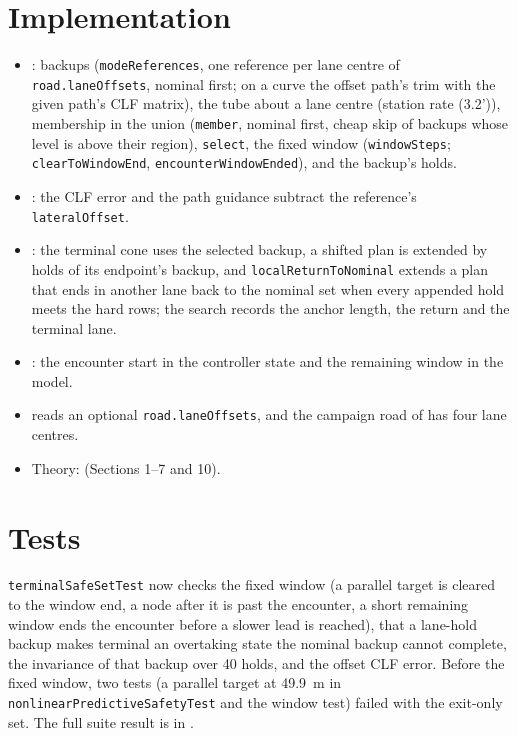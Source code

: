 \documentclass[11pt]{article}
\begin{document}
\section{Implementation}
\begin{itemize}
\item {}: backups (\texttt{modeReferences},
  one reference per lane centre of \texttt{road.laneOffsets}, nominal first;
  on a curve the offset path's trim with the given path's CLF matrix), the
  tube about a lane centre (station rate (3.2')), membership in the union
  (\texttt{member}, nominal first, cheap skip of backups whose level is above
  their region), \texttt{select}, the fixed window (\texttt{windowSteps};
  \texttt{clearToWindowEnd}, \texttt{encounterWindowEnded}), and the backup's
  holds.
\item {}: the CLF error and the path
  guidance subtract the reference's \texttt{lateralOffset}.
\item {}: the terminal cone uses the
  selected backup, a shifted plan is extended by holds of its endpoint's
  backup, and \texttt{localReturnToNominal} extends a plan that ends in
  another lane back to the nominal set when every appended hold meets the
  hard rows; the search records the anchor length, the return and the
  terminal lane.
\item {}: the encounter start
  in the controller state and the remaining window in the model.
\item {} reads an optional
  \texttt{road.laneOffsets}, and the campaign road of
   has four lane centres.
\item Theory:  (Sections 1--7 and 10).
\end{itemize}

\section{Tests}
\texttt{terminalSafeSetTest} now checks the fixed window (a parallel target is
cleared to the window end, a node after it is past the encounter, a short
remaining window ends the encounter before a slower lead is reached), that a
lane-hold backup makes terminal an overtaking state the nominal backup cannot
complete, the invariance of that backup over 40 holds, and the offset CLF
error. Before the fixed window, two tests (a parallel target at 49.9~m in
\texttt{nonlinearPredictiveSafetyTest} and the window test) failed with the
exit-only set. The full suite result is in .
\end{document}
